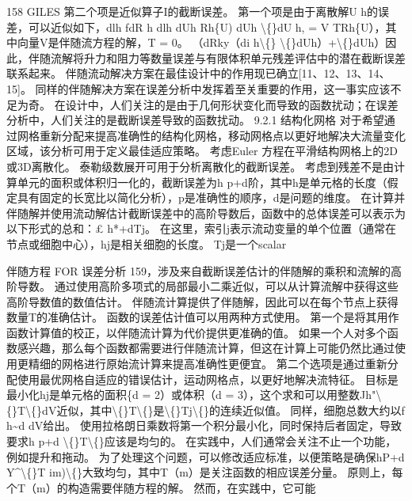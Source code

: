\documentclass[UTF8,11pt,a4paper,openany,fontset=fandol]{ctexbook}
\begin{document}
158 GILES 第二个项是近似算子I的截断误差。 第一个项是由于离散解U h的误差，可以近似如下，dlh fdR h dlh dUh Rh\{U) dUh \textbackslash\{\}dU h, = V TRh\{U），其中向量V是伴随流方程的解，T = 0。 （dRky（di h\textbackslash\{\} \textbackslash\{\}dUh）+\textbackslash\{\}dUh）因此，伴随流解将升力和阻力等数量误差与有限体积单元残差评估中的潜在截断误差联系起来。 伴随流动解决方案在最佳设计中的作用现已确立[11、12、13、14、15]。 同样的伴随解决方案在误差分析中发挥着至关重要的作用，这一事实应该不足为奇。 在设计中，人们关注的是由于几何形状变化而导致的函数扰动；在误差分析中，人们关注的是截断误差导致的函数扰动。 9.2.1 结构化网格 对于希望通过网格重新分配来提高准确性的结构化网格，移动网格点以更好地解决大流量变化区域，该分析可用于定义最佳适应策略。 考虑Euler 方程在平滑结构网格上的2D或3D离散化。 泰勒级数展开可用于分析离散化的截断误差。 考虑到残差不是由计算单元的面积或体积归一化的，截断误差为h p+d阶，其中h是单元格的长度（假定具有固定的长宽比以简化分析），p是准确性的顺序，d是问题的维度。 在计算并伴随解并使用流动解估计截断误差中的高阶导数后，函数中的总体误差可以表示为以下形式的总和：£ h*+dTj。 在这里，索引j表示流动变量的单个位置（通常在节点或细胞中心），hj是相关细胞的长度。 Tj是一个scalar

伴随方程 FOR 误差分析 159，涉及来自截断误差估计的伴随解的乘积和流解的高阶导数。 通过使用高阶多项式的局部最小二乘近似，可以从计算流解中获得这些高阶导数值的数值估计。 伴随流计算提供了伴随解，因此可以在每个节点上获得数量T的准确估计。 函数的误差估计值可以用两种方式使用。 第一个是将其用作函数计算值的校正，以伴随流计算为代价提供更准确的值。 如果一个人对多个函数感兴趣，那么每个函数都需要进行伴随流计算，但这在计算上可能仍然比通过使用更精细的网格进行原始流计算来提高准确性更便宜。 第二个选项是通过重新分配使用最优网格自适应的错误估计，运动网格点，以更好地解决流特征。 目标是最小化hj是单元格的面积\{d = 2）或体积（d = 3），这个求和可以用整数Jh"\textbackslash\{\}T\textbackslash\{\}dV近似，其中\textbackslash\{\}T\textbackslash\{\}是\textbackslash\{\}Tj\textbackslash\{\}的连续近似值。 同样，细胞总数大约以f h\textasciitilde{}d dV给出。 使用拉格朗日乘数将第一个积分最小化，同时保持后者固定，导致要求h p+d \textbackslash\{\}T\textbackslash\{\}应该是均匀的。 在实践中，人们通常会关注不止一个功能，例如提升和拖动。 为了处理这个问题，可以修改适应标准，以便策略是确保hP+d Y\textasciicircum{}\textbackslash\{\}T im)\textbackslash\{\}大致均匀，其中T（m）是关注函数的相应误差分量。 原则上，每个T（m）的构造需要伴随方程的解。 然而，在实践中，它可能
\end{document}
